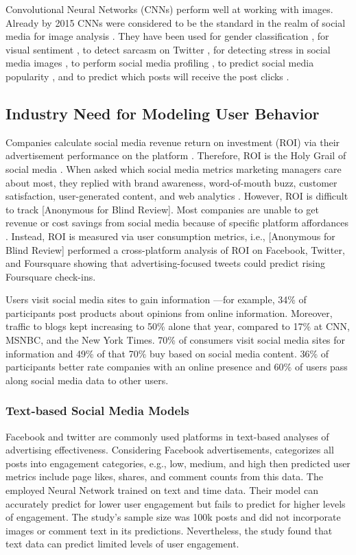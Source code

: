\documentclass[mksc,blindrev]{informs3} %
\begin{document}
Convolutional Neural Networks (CNNs) perform well at working with images. Already by 2015 CNNs were considered to be the standard in the realm of social media for image analysis \cite{Hassner2015}. They have been used for gender classification \cite{Hassner2015}, for visual sentiment \cite{Segalin2017,Xu2014}, to detect sarcasm on Twitter \cite{Poria2016}, for detecting stress in social media images \cite{Lin2014}, to perform social media profiling \cite{Segalin2017}, to predict social media popularity \cite{Gelli2015}, and to predict which posts will receive the post clicks \cite{Khosla2014}.

\subsection{Industry Need for Modeling User Behavior}

Companies calculate social media revenue return on investment (ROI) via their advertisement performance on the platform \cite{Fisher2009}. Therefore, ROI is the Holy Grail of social media \cite{Fisher2009}. When asked which social media metrics marketing managers care about most, they replied with brand awareness, word-of-mouth buzz, customer satisfaction, user-generated content, and web analytics \cite{Tiago2014}. However, ROI is difficult to track [Anonymous for Blind Review]. Most companies are unable to get revenue or cost savings from social media because of specific platform affordances \cite{Romero2011}. Instead, ROI is measured via user consumption metrics, i.e., [Anonymous for Blind Review] performed a cross-platform analysis of ROI on Facebook, Twitter, and Foursquare showing that advertising-focused tweets could predict rising Foursquare check-ins.

Users visit social media sites to gain information \cite{Schrter2021CanFP, Fisher2009, Clark2013TheIO}—for example, 34\% of participants post products about opinions from online information. Moreover, traffic to blogs kept increasing to 50\% alone that year, compared to 17\% at CNN, MSNBC, and the New York Times. 70\% of consumers visit social media sites for information and 49\% of that 70\% buy based on social media content. 36\% of participants better rate companies with an online presence and 60\% of users pass along social media data to other users. 

\subsubsection{Text-based Social Media Models}
Facebook and twitter are commonly used platforms in text-based analyses of advertising effectiveness. Considering Facebook advertisements, \cite{Lotze2021RankingCQ} categorizes all posts into engagement categories, e.g., low, medium, and high then predicted user metrics include page likes, shares, and comment counts from this data. The employed Neural Network trained on text and time data. Their model can accurately predict for lower user engagement but fails to predict for higher levels of engagement. The study’s sample size was 100k posts and did not incorporate images or comment text in its predictions. Nevertheless, the study found that text data can predict limited levels of user engagement.
\end{document}
